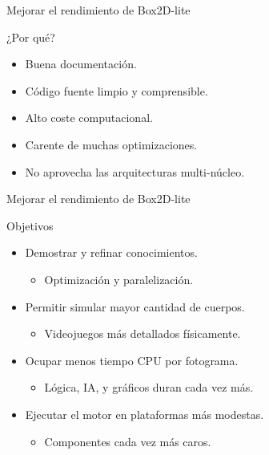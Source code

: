 \documentclass[10pt,xcolor=table]{beamer}
\begin{document}
\begin{frame}{Mejorar el rendimiento de Box2D-lite}

  \begin{block}{¿Por qué?}
  \begin{itemize}
    \item Buena documentación.
    \item Código fuente limpio y comprensible.
    \item Alto coste computacional.
    \item Carente de muchas optimizaciones.
    \item No aprovecha las arquitecturas multi-núcleo.
    \end{itemize}
  \end{block}
\end{frame}

\begin{frame}{Mejorar el rendimiento de Box2D-lite}

  \begin{block}{Objetivos}
  \begin{itemize}
    \item Demostrar y refinar conocimientos.
    \begin{itemize}
      \item Optimización y paralelización.
    \end{itemize}
    \item Permitir simular mayor cantidad de cuerpos.
    \begin{itemize}
      \item Videojuegos más detallados físicamente.
    \end{itemize}
    \item Ocupar menos tiempo CPU por fotograma.
    \begin{itemize}
      \item Lógica, IA, y gráficos duran cada vez más.
    \end{itemize}
    \item Ejecutar el motor en plataformas más modestas.
    \begin{itemize}
      \item Componentes cada vez más caros.
    \end{itemize}
  \end{itemize}
  \end{block}
\end{frame}
\end{document}
